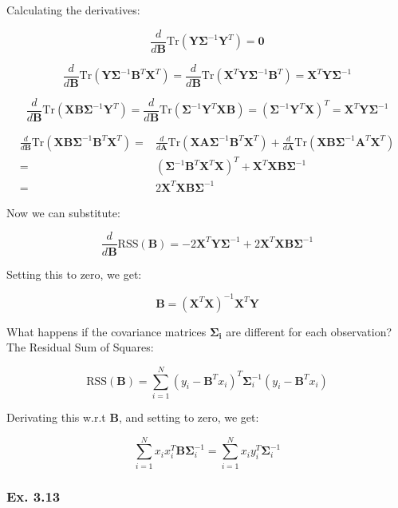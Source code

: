 \documentclass{article}
\begin{document}
Calculating the derivatives:

\[
\frac{d}{d\mathbf{B}}\text{Tr}(\mathbf{Y} \mathbf{\Sigma}^{-1} \mathbf{Y}^T) = \mathbf{0}
\]

\[
\frac{d}{d\mathbf{B}}\text{Tr}(\mathbf{Y} \mathbf{\Sigma}^{-1} \mathbf{B}^T \mathbf{X}^T) = \frac{d}{d\mathbf{B}}\text{Tr}(\mathbf{X}^T \mathbf{Y} \mathbf{\Sigma}^{-1} \mathbf{B}^T) = \mathbf{X}^T \mathbf{Y} \mathbf{\Sigma}^{-1}
\]

\[
\frac{d}{d\mathbf{B}}\text{Tr}(\mathbf{X}\mathbf{B}\mathbf{\Sigma}^{-1}\mathbf{Y}^T) = \frac{d}{d\mathbf{B}}\text{Tr}(\mathbf{\Sigma}^{-1}\mathbf{Y}^T\mathbf{X}\mathbf{B}) = (\mathbf{\Sigma}^{-1}\mathbf{Y}^T\mathbf{X})^T = \mathbf{X}^T \mathbf{Y} \mathbf{\Sigma}^{-1}
\]

\[
\begin{split}
\frac{d}{d\mathbf{B}}\text{Tr}(\mathbf{X} \mathbf{B} \mathbf{\Sigma}^{-1} \mathbf{B}^T \mathbf{X}^T) =& \frac{d}{d\mathbf{A}}\text{Tr}(\mathbf{X} \mathbf{A} \mathbf{\Sigma}^{-1} \mathbf{B}^T \mathbf{X}^T) + \frac{d}{d\mathbf{A}}\text{Tr}(\mathbf{X} \mathbf{B} \mathbf{\Sigma}^{-1} \mathbf{A}^T \mathbf{X}^T)\\
=& (\mathbf{\Sigma}^{-1} \mathbf{B}^T \mathbf{X}^T \mathbf{X})^T + \mathbf{X}^T \mathbf{X} \mathbf{B} \mathbf{\Sigma}^{-1}\\
=& 2\mathbf{X}^T \mathbf{X} \mathbf{B} \mathbf{\Sigma}^{-1}
\end{split}
\]

Now we can substitute:

\[
\frac{d}{d\mathbf{B}} \text{RSS}(\mathbf{B}) = -2 \mathbf{X}^T \mathbf{Y} \mathbf{\Sigma}^{-1} + 2\mathbf{X}^T \mathbf{X} \mathbf{B} \mathbf{\Sigma}^{-1}
\]

Setting this to zero, we get:

\[
\mathbf{B} = (\mathbf{X}^T\mathbf{X})^{-1}\mathbf{X}^T\mathbf{Y}
\]

What happens if the covariance matrices $\mathbf{\Sigma_i}$ are different for each observation? The Residual Sum of Squares:

\[
\text{RSS}(\mathbf{B}) = \sum_{i=1}^{N} (y_i - \mathbf{B}^Tx_i)^T \mathbf{\Sigma}^{-1}_i (y_i - \mathbf{B}^Tx_i)
\]

Derivating this w.r.t $\mathbf{B}$, and setting to zero, we get:

\[
\sum_{i=1}^{N} x_i x^T_i \mathbf{B} \mathbf{\Sigma}^{-1}_i = \sum_{i=1}^{N} x_i y^T_i \mathbf{\Sigma}^{-1}_i
\]

\subsubsection{Ex. 3.13}
\end{document}
